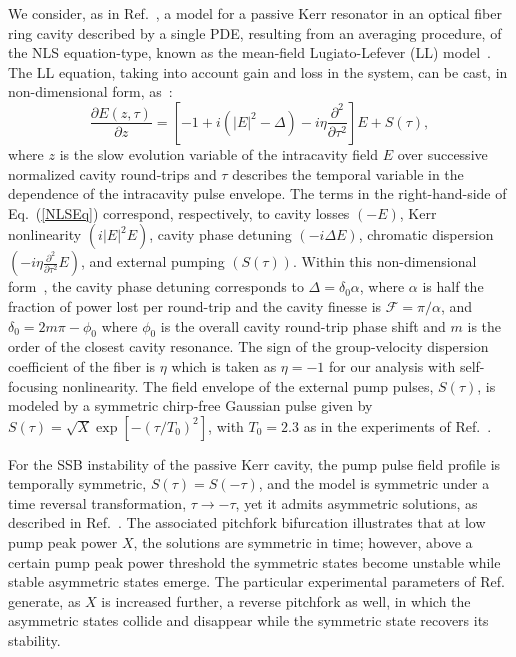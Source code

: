 We consider, as in Ref.~\cite{XuCoen}, a model for a passive Kerr resonator in an 
optical fiber ring cavity described by a single PDE,
resulting from an averaging procedure, of the NLS
equation-type, known as the mean-field Lugiato-Lefever (LL) 
model~\cite{LL,LLE}. The LL
equation, taking into account gain and loss in the system, can be cast, 
in non-dimensional form, as~\cite{XuCoen,XuCoenRef22a,XuCoenRef22b}:
%
\begin{equation}
\frac{\partial E(z, \tau)}{\partial z} = \left[ -1 + i (\left\vert E\right\vert^2 - \Delta ) - i \eta \frac{\partial^2}{\partial \tau^2} \right] E + S(\tau), 
\label{NLSEq}
\end{equation}
%
where $z$ is the slow evolution variable of the intracavity field $E$ over 
successive normalized cavity round-trips and $\tau$ describes the temporal 
variable in the dependence of the intracavity pulse envelope.  
%
The terms in the right-hand-side  of Eq.~(\ref{NLSEq}) correspond, respectively, to
cavity losses $(-E)$, Kerr nonlinearity $(i \left\vert E\right\vert^2 E)$, cavity 
phase detuning $(-i \Delta E)$, chromatic dispersion 
$( - i \eta \frac{\partial^2}{\partial \tau^2}E)$, and external pumping $( S(\tau))$.  
%
Within this non-dimensional form~\cite{XuCoenRef22a,XuCoenRef22b}, 
the cavity phase detuning
corresponds to $\Delta = \delta_0\alpha$, where $\alpha$ is half the fraction of 
power lost per round-trip and the cavity finesse is $\mathscr{F} = \pi/\alpha$, and 
$\delta_0 = 2m\pi  - \phi_0$ where $\phi_0$ is the overall cavity round-trip 
phase shift and $m$ is the order of the closest cavity resonance.  
%
The sign of the group-velocity dispersion coefficient of the fiber is $\eta$ 
which is taken as $\eta = -1$ for our analysis with self-focusing nonlinearity.  
The field envelope of the external pump pulses, $S(\tau)$, is modeled by a symmetric chirp-free Gaussian pulse given by $S(\tau) = \sqrt{X} \exp\left[ -(\tau/T_0)^2 \right]$,
with $T_0 = 2.3$ as in the experiments of Ref.~\cite{XuCoen}.

For the SSB instability of the passive Kerr cavity, the pump pulse field profile is temporally symmetric, $S(\tau) = S(-\tau)$, and the model is symmetric under a time reversal transformation, $\tau \rightarrow -\tau$, 
yet it admits asymmetric solutions, as described in Ref.~\cite{XuCoen}.  The 
associated pitchfork bifurcation illustrates that at low pump peak power $X$, the solutions are symmetric in time; however, above a certain pump peak power threshold the symmetric states become unstable while stable asymmetric states
emerge.  
%
The particular experimental parameters of Ref.~\cite{XuCoen} generate, as $X$ is
increased further, a reverse pitchfork as well, in which the asymmetric states
collide and disappear while the symmetric state recovers its stability.
%
%


